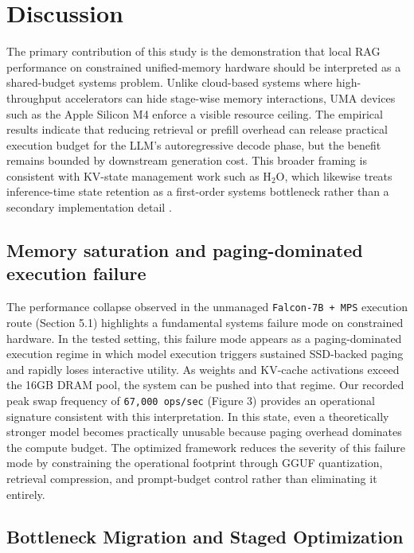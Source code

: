 \documentclass[10pt,twocolumn]{article}
\begin{document}
\section{Discussion}

The primary contribution of this study is the demonstration that local RAG performance on constrained unified-memory hardware should be interpreted as a shared-budget systems problem. Unlike cloud-based systems where high-throughput accelerators can hide stage-wise memory interactions, UMA devices such as the Apple Silicon M4 enforce a visible resource ceiling. The empirical results indicate that reducing retrieval or prefill overhead can release practical execution budget for the LLM's autoregressive decode phase, but the benefit remains bounded by downstream generation cost. This broader framing is consistent with KV-state management work such as H$_2$O, which likewise treats inference-time state retention as a first-order systems bottleneck rather than a secondary implementation detail \cite{zhang2023h2o}.

\subsection{Memory saturation and paging-dominated execution failure}

The performance collapse observed in the unmanaged \texttt{Falcon-7B + MPS} execution route (Section 5.1) highlights a fundamental systems failure mode on constrained hardware. In the tested setting, this failure mode appears as a paging-dominated execution regime in which model execution triggers sustained SSD-backed paging and rapidly loses interactive utility. As weights and KV-cache activations exceed the 16GB DRAM pool, the system can be pushed into that regime. Our recorded peak swap frequency of \texttt{67,000 ops/sec} (Figure 3) provides an operational signature consistent with this interpretation. In this state, even a theoretically stronger model becomes practically unusable because paging overhead dominates the compute budget. The optimized framework reduces the severity of this failure mode by constraining the operational footprint through GGUF quantization, retrieval compression, and prompt-budget control rather than eliminating it entirely.

\subsection{Bottleneck Migration and Staged Optimization}
\end{document}
